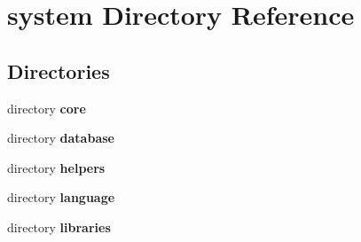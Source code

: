 \section{system Directory Reference}
\label{dir_e8522150b400a43ebfdbd1fed060b8e2}
\subsection*{Directories}
\begin{DoxyCompactItemize}
\item 
directory {\bf core}
\item 
directory {\bf database}
\item 
directory {\bf helpers}
\item 
directory {\bf language}
\item 
directory {\bf libraries}
\end{DoxyCompactItemize}

